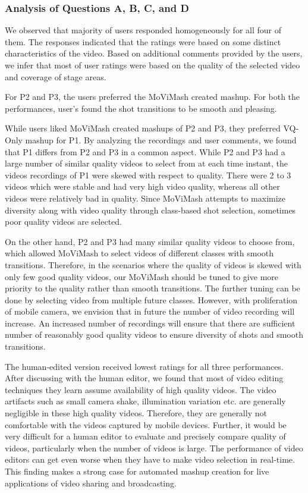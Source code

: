 \documentclass{sig-alternate-05-2015}
\begin{document}
\subsubsection{Analysis of Questions A, B, C, and D}
We observed that majority of users responded homogeneously
for all four of them. The responses indicated that the ratings were
based on some distinct characteristics of the video. Based on additional comments provided by the users, we infer that most of user
ratings were based on the quality of the selected video and coverage
of stage areas.

For P2 and P3, the users preferred the MoViMash created mashup.
For both the performances, user's found the shot transitions to be
smooth and pleasing.

While users liked MoViMash created mashups of P2 and P3,
they preferred VQ-Only mashup for P1. By analyzing the recordings and user comments, we found that P1 differs from P2 and P3 in
a common aspect. While P2 and P3 had a large number of similar
quality videos to select from at each time instant, the videos recordings of P1 were skewed with respect to quality. There were 2 to 3
videos which were stable and had very high video quality, whereas
all other videos were relatively bad in quality. Since MoViMash
attempts to maximize diversity along with video quality through
class-based shot selection, sometimes poor quality videos are selected.

On the other hand, P2 and P3 had many similar quality videos
to choose from, which allowed MoViMash to select videos of different classes with smooth transitions. Therefore, in the scenarios
where the quality of videos is skewed with only few good quality
videos, our MoViMash should be tuned to give more priority to
the quality rather than smooth transitions. The further tuning can
be done by selecting video from multiple future classes. However,
with proliferation of mobile camera, we envision that in future the
number of video recording will increase. An increased number of
recordings will ensure that there are sufficient number of reasonably good quality videos to ensure diversity of shots and smooth
transitions.

The human-edited version received lowest ratings for all three
performances. After discussing with the human editor, we found
that most of video editing techniques they learn assume availability
of high quality videos. The video artifacts such as small camera shake, illumination variation etc. are generally negligible in these
high quality videos. Therefore, they are generally not comfortable
with the videos captured by mobile devices. Further, it would be
very difficult for a human editor to evaluate and precisely compare
quality of videos, particularly when the number of videos is large.
The performance of video editors can get even worse when they
have to make video selection in real-time. This finding makes a
strong case for automated mashup creation for live applications of
video sharing and broadcasting.
\end{document}
